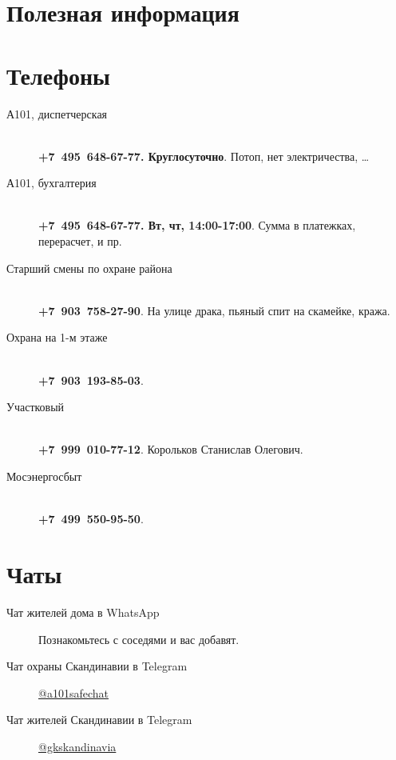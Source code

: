 \documentclass[10pt,landscape,a4paper]{article}
\begin{document}

\section*{Полезная информация\hfill{}}

\noindent\makebox[\linewidth]{\rule{0.9\paperwidth}{0.4pt}}

\small
\begin{multicols*}{3}
  \section*{Телефоны}
  \begin{description}
  \item[А101, диспетчерская]\hfill \\ \textbf{+7~495~648-67-77. Круглосуточно}. Потоп, нет электричества, …
  \item[А101, бухгалтерия]\hfill \\ \textbf{+7~495~648-67-77. Вт, чт, 14:00-17:00}. Сумма в платежках, перерасчет, и пр.
  \item[Старший смены по охране района]\hfill \\ \textbf{+7~903~758-27-90}. На улице драка, пьяный спит на скамейке, кража.
  \item[Охрана на 1-м этаже]\hfill \\ \textbf{+7~903~193-85-03}.
  \item[Участковый]\hfill \\ \textbf{+7~999~010-77-12}. Корольков Станислав Олегович.
  \item[Мосэнергосбыт]\hfill \\ \textbf{+7~499~550-95-50}.
  \end{description}

  \section*{Чаты}

  \begin{description}
  \item[Чат жителей дома в WhatsApp] Познакомьтесь с соседями и вас добавят.
  \item[Чат охраны Скандинавии в Telegram] \href{https://t.me/a101safechat}{@a101safechat}
  \item[Чат жителей Скандинавии в Telegram] \href{https://t.me/gkskandinavia}{@gkskandinavia}
  \end{description}


\end{multicols*}
\end{document}

